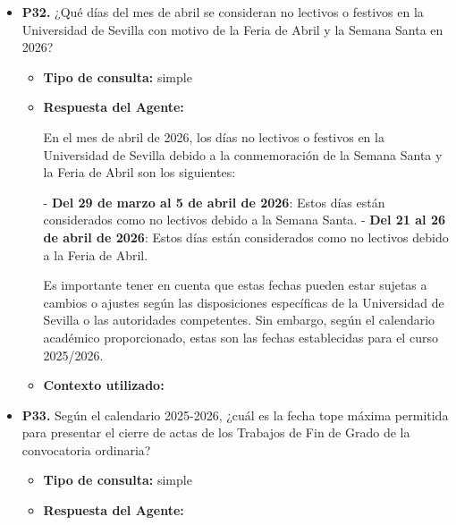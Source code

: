 \documentclass{article}
\begin{document}
\begin{itemize}
\begin{itemize}
                        Por lo tanto, las fechas exactas de inicio de las clases del segundo cuatrimestre son el \textbf{26 de enero de 2026} para títulos de grado (caso general), el \textbf{19 de enero de 2026} para títulos de grado (caso excepcional), y el \textbf{12 de febrero de 2026} para títulos de máster.
                  \item \textbf{Contexto utilizado:}

            \end{itemize}

      \item \textbf{P32.} ¿Qué días del mes de abril se consideran no lectivos o festivos en la Universidad de Sevilla con motivo de la Feria de Abril y la Semana Santa en 2026? \\
            \begin{itemize}
                  \item \textbf{Tipo de consulta:} simple
                  \item \textbf{Respuesta del Agente:}

                        En el mes de abril de 2026, los días no lectivos o festivos en la Universidad de Sevilla debido a la conmemoración de la Semana Santa y la Feria de Abril son los siguientes:

                        - \textbf{Del 29 de marzo al 5 de abril de 2026}: Estos días están considerados como no lectivos debido a la Semana Santa.
                        - \textbf{Del 21 al 26 de abril de 2026}: Estos días están considerados como no lectivos debido a la Feria de Abril.

                        Es importante tener en cuenta que estas fechas pueden estar sujetas a cambios o ajustes según las disposiciones específicas de la Universidad de Sevilla o las autoridades competentes. Sin embargo, según el calendario académico proporcionado, estas son las fechas establecidas para el curso 2025/2026.
                  \item \textbf{Contexto utilizado:}

            \end{itemize}

      \item \textbf{P33.} Según el calendario 2025-2026, ¿cuál es la fecha tope máxima permitida para presentar el cierre de actas de los Trabajos de Fin de Grado de la convocatoria ordinaria? \\
            \begin{itemize}
                  \item \textbf{Tipo de consulta:} simple
                  \item \textbf{Respuesta del Agente:}


\end{itemize}
\end{itemize}
\end{document}
